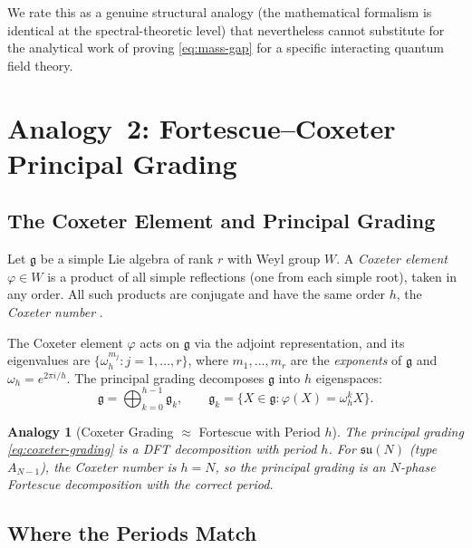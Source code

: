 \documentclass[11pt]{article}
\newtheorem{analogy}[theorem]{Analogy}
\newcommand{\su}{\mathfrak{su}}
\newcommand{\g}{\mathfrak{g}}
\begin{document}
We rate this as a genuine structural analogy (the mathematical
formalism is identical at the spectral-theoretic level) that
nevertheless cannot substitute for the analytical work of proving
\eqref{eq:mass-gap} for a specific interacting quantum field theory.

\section{Analogy~2: Fortescue--Coxeter Principal Grading}
\label{sec:analogy-coxeter}

\subsection{The Coxeter Element and Principal Grading}

Let $\g$ be a simple Lie algebra of rank $r$ with Weyl group $W$. A
\emph{Coxeter element} $\varphi \in W$ is a product of all simple
reflections (one from each simple root), taken in any order. All
such products are conjugate and have the same order $h$, the
\emph{Coxeter number} \cite{humphreys1990}.

The Coxeter element $\varphi$ acts on $\g$ via the adjoint
representation, and its eigenvalues are $\{\omega_h^{m_j} : j = 1,
\ldots, r\}$, where $m_1, \ldots, m_r$ are the \emph{exponents} of
$\g$ and $\omega_h = e^{2\pi i/h}$. The principal grading decomposes
$\g$ into $h$ eigenspaces:
\begin{equation}\label{eq:coxeter-grading}
  \g = \bigoplus_{k=0}^{h-1} \g_k,
  \qquad \g_k = \{X \in \g : \varphi(X) = \omega_h^k X\}.
\end{equation}

\begin{analogy}[Coxeter Grading $\approx$ Fortescue with Period $h$]
\label{an:coxeter}
The principal grading \eqref{eq:coxeter-grading} is a DFT
decomposition with period $h$. For $\su(N)$ (type $A_{N-1}$), the
Coxeter number is $h = N$, so the principal grading \emph{is}
an $N$-phase Fortescue decomposition with the correct period.
\end{analogy}

\subsection{Where the Periods Match}
\end{document}
